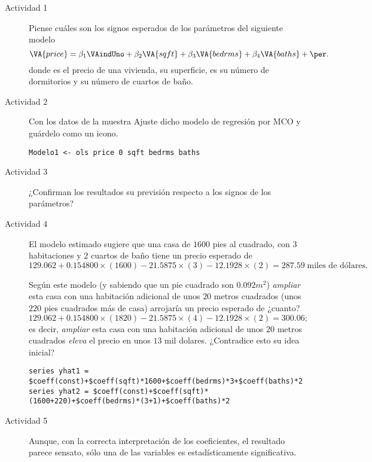 \documentclass[11pt]{article}
\begin{document}
\begin{description}
\item[{Actividad 1}] Piense cuáles son los signos esperados de los
parámetros del siguiente modelo
\begin{displaymath}
   \VA{price}=
   \beta_1\VAindUno+
   \beta_2\VA{sqft}+
   \beta_3\VA{bedrms}+
   \beta_4\VA{baths}+
   \per.
 \end{displaymath}
  donde  es el precio de una vivienda,  su
superficie,  es su número de dormitorios y  su
número de cuartos de baño.

\item[{Actividad 2}] Con los datos de la muestra Ajuste dicho modelo de
regresión por MCO y guárdelo como un icono.
\begin{verbatim}
Modelo1 <- ols price 0 sqft bedrms baths 
\end{verbatim}

\item[{Actividad 3}] ¿Confirman los resultados su previsión respecto a los
signos de los parámetros?

\item[{Actividad 4}] El modelo estimado sugiere que una casa de \(1600\) pies al cuadrado,
con \(3\) habitaciones y \(2\) cuartos de baño tiene un precio esperado de
\begin{displaymath}
  129.062 + 0.154800\times(1600) -21.5875\times(3) -12.1928\times(2) =  287.59 \; \text{miles de dólares.}
\end{displaymath}

Según este modelo (y sabiendo que un pie cuadrado son \(0.092m^2\))
\emph{ampliar} esta casa con una habitación adicional de unos \(20\) metros
cuadrados (unos \(220\) pies cuadrados más de casa) arrojaría un
precio esperado de ¿cuanto?
\begin{displaymath}
   129.062 + 0.154800\times(1820) -21.5875\times(4) -12.1928\times(2) =  300.06;
\end{displaymath}
es decir, \emph{ampliar} esta casa con una habitación adicional de unos
\(20\) metros cuadrados \emph{eleva} el precio en unos \(13\) mil dolares.
¿Contradice esto su idea inicial?
\begin{verbatim}
series yhat1 = $coeff(const)+$coeff(sqft)*1600+$coeff(bedrms)*3+$coeff(baths)*2
series yhat2 = $coeff(const)+$coeff(sqft)*(1600+220)+$coeff(bedrms)*(3+1)+$coeff(baths)*2
\end{verbatim}

\item[{Actividad 5}] Aunque, con la correcta interpretación de los
coeficientes, el resultado parece sensato, sólo una de las variables
es estadísticamente significativa.


\end{description}
\end{document}
